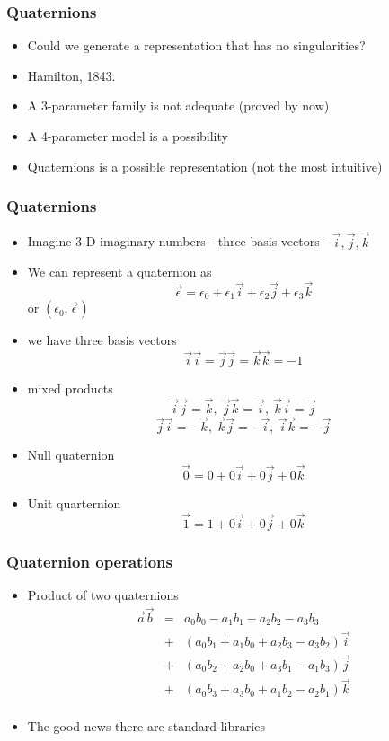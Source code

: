 \documentclass[10pt]{beamer}
\begin{document}
\begin{frame}
  \frametitle{Quaternions}
  \begin{itemize}
  \item Could we generate a representation that has no singularities?
  \item Hamilton, 1843. 
  \item A 3-parameter family is not adequate (proved by now)
  \item A 4-parameter model is a possibility
  \item Quaternions is a possible representation (not the most intuitive)
  \end{itemize}
\end{frame}

\begin{frame}
  \frametitle{Quaternions}
  \begin{itemize}
  \item Imagine 3-D imaginary numbers - three basis vectors - $\vec{i}, \vec{j}, \vec{k}$
  \item We can represent a quaternion as
    \[
      \vec{\epsilon} = \epsilon_0 + \epsilon_1 \vec{i} + \epsilon_2 \vec{j} + \epsilon_3 \vec{k}
    \]
    or $(\epsilon_0,\vec{\epsilon})$
    \pause
  \item we have three basis vectors
    \[ \vec{i}\vec{i} = \vec{j}\vec{j} = \vec{k}\vec{k} = -1 \]
  \item mixed products
    \[ \vec{i}\vec{j}=\vec{k}, ~ \vec{j}\vec{k} = \vec{i}, ~ \vec{k}\vec{i} = \vec{j}
    \]
    \[
      \vec{j}\vec{i} = -\vec{k}, ~ \vec{k}\vec{j} = -\vec{i}, ~ \vec{i}\vec{k} = -\vec{j}
    \]
  \item Null quaternion
    \[ \vec{0} = 0 + 0\vec{i} + 0 \vec{j} + 0 \vec{k} \]
  \item Unit quarternion
    \[ \vec{1} = 1 + 0 \vec{i} + 0 \vec{j} + 0 \vec{k} \]
  \end{itemize}
\end{frame}

\begin{frame}
  \frametitle{Quaternion operations}
  \begin{itemize}
  \item Product of two quaternions
    \[
      \begin{array}{ccc}
        \vec{a}\vec{b} & = & a_0 b_0 - a_1 b_1-a_2 b_2-a_3 b_3\\
                       & +  & (a_0 b_1 + a_1 b_0 + a_2 b_3 - a_3 b_2 ) \vec{i} \\
                       & +  & (a_0 b_2 + a_2 b_0 + a_3 b_1 - a_1 b_3) \vec{j} \\
                       & +  & (a_0 b_3 + a_3 b_0 + a_1 b_2 - a_2 b_1) \vec{k} \\
      \end{array}
    \]
  \item The good news there are standard libraries
  \end{itemize}
\end{frame}
\end{document}
